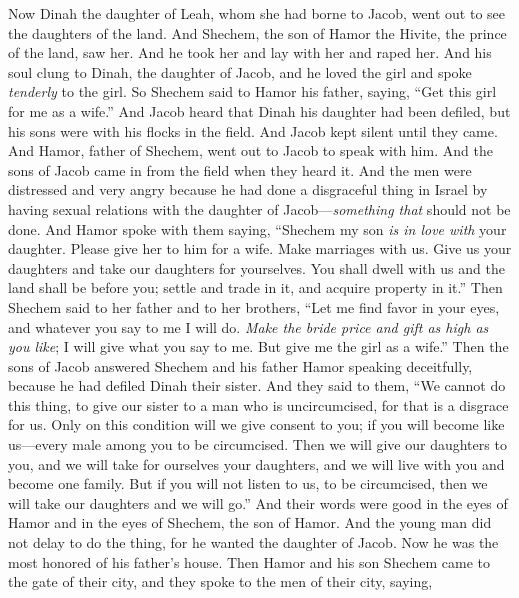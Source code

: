 \begin{biblechapter} %
 Now Dinah the daughter of Leah, whom she had borne to Jacob, went out to see the daughters of the land.
\verse And Shechem, the son of Hamor the Hivite, the prince of the land, saw her. And he took her and lay with her and raped her.
\verse And his soul clung to Dinah, the daughter of Jacob, and he loved the girl and spoke \textit{tenderly} to the girl.
\verse So Shechem said to Hamor his father, saying, “Get this girl for me as a wife.”
\verse And Jacob heard that Dinah his daughter had been defiled, but his sons were with his flocks in the field. And Jacob kept silent until they came.
\verse And Hamor, father of Shechem, went out to Jacob to speak with him.
\verse And the sons of Jacob came in from the field when they heard it. And the men were distressed and very angry because he had done a disgraceful thing in Israel by having sexual relations with the daughter of Jacob—\textit{something that} should not be done.
\verse And Hamor spoke with them saying, “Shechem my son \textit{is in love with} your daughter. Please give her to him for a wife.
\verse Make marriages with us. Give us your daughters and take our daughters for yourselves.
\verse You shall dwell with us and the land shall be before you; settle and trade in it, and acquire property in it.”
\verse Then Shechem said to her father and to her brothers, “Let me find favor in your eyes, and whatever you say to me I will do.
\verse \textit{Make the bride price and gift as high as you like}; I will give what you say to me. But give me the girl as a wife.”
\verse Then the sons of Jacob answered Shechem and his father Hamor speaking deceitfully, because he had defiled Dinah their sister.
\verse And they said to them, “We cannot do this thing, to give our sister to a man who is uncircumcised, for that is a disgrace for us.
\verse Only on this condition will we give consent to you; if you will become like us—every male among you to be circumcised.
\verse Then we will give our daughters to you, and we will take for ourselves your daughters, and we will live with you and become one family.
\verse But if you will not listen to us, to be circumcised, then we will take our daughters and we will go.”
\verse And their words were good in the eyes of Hamor and in the eyes of Shechem, the son of Hamor.
\verse And the young man did not delay to do the thing, for he wanted the daughter of Jacob. Now he was the most honored of his father’s house.
\verse Then Hamor and his son Shechem came to the gate of their city, and they spoke to the men of their city, saying,

\end{biblechapter}
